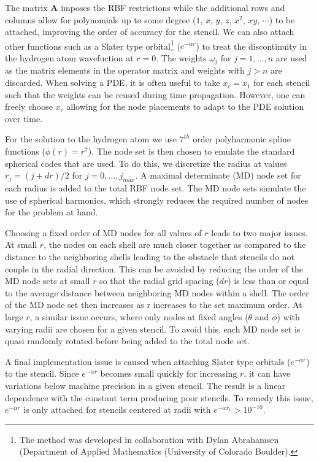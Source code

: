 The matrix $\mathbf{A}$ imposes the RBF restrictions while the additional rows and columns allow for polynomials up to some degree ($1$, $x$, $y$, $z$, $x^2$, $xy$, $\cdots$) to be attached, improving the order of accuracy for the stencil. We can also attach other functions such as a Slater type orbital\footnote{The method was developed in collaboration with Dylan Abrahamsen (Department of Applied Mathematics (University of Colorado Boulder).} ($e^{-\alpha r}$) to treat the discontinuity in the hydrogen atom wavefuction at $r=0$. The weights $\omega_j$ for $j=1, \dots, n$ are used as the matrix elements in the operator matrix and weights with $j>n$ are discarded. When solving a PDE, it is often useful to take $x_c=x_1$ for each stencil such that the weights can be reused during time propagation. However, one can freely choose $x_c$ allowing for the node placements to adapt to the PDE solution over time. 

For the solution to the hydrogen atom we use $7^{th}$ order polyharmonic spline functions ($\phi(r)=r^7$). The node set is then chosen to emulate the standard spherical codes that are used. To do this, we discretize the radius at values $r_j=(j+dr)/2$ for $j=0, \dots, j_{max}$. A maximal determinate (MD) node set \cite{Womersley2007} for each radius is added to the total RBF node set. The MD node sets simulate the use of spherical harmonics, which strongly reduces the required number of nodes for the problem at hand. 

Choosing a fixed order of MD nodes for all values of $r$ leads to two major issues. At small $r$, the nodes on each shell are much closer together as compared to the distance to the neighboring shells leading to the obstacle that stencils do not couple in the radial direction. This can be avoided by reducing the order of the MD node sets at small $r$ so that the radial grid spacing ($dr$) is less than or equal to the average distance between neighboring MD nodes within a shell. The order of the MD node set then increases as r increases to the set maximum order. At large $r$, a similar issue occurs, where only nodes at fixed angles ($\theta$ and $\phi$) with varying radii are chosen for a given stencil. To avoid this, each MD node set is quasi randomly rotated before being added to the total node set. 

A final implementation issue is caused when attaching Slater type orbitals ($e^{-\alpha r}$) to the stencil. Since $e^{-\alpha r}$ becomes small quickly for increasing $r$, it can have variations below machine precision in a given stencil. The result is a linear dependence with the constant term producing poor stencils. To remedy this issue, $e^{-\alpha r}$ is only attached for stencils centered at radii with $e^{-\alpha r_1}>10^{-10}$.

